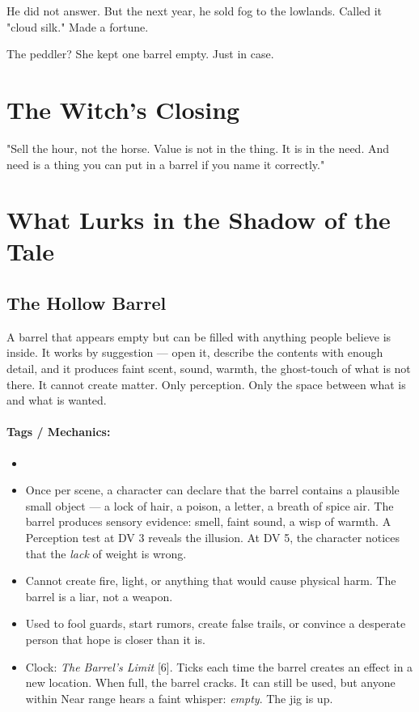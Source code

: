 He did not answer. But the next year, he sold fog to the lowlands. Called it "cloud silk." Made a fortune.

The peddler? She kept one barrel empty. Just in case.

\section*{The Witch's Closing}
"Sell the hour, not the horse. Value is not in the thing. It is in the need. And need is a thing you can put in a barrel if you name it correctly."

\section*{What Lurks in the Shadow of the Tale}

\subsection*{The Hollow Barrel}

A barrel that appears empty but can be filled with anything people believe is inside. It works by suggestion — open it, describe the contents with enough detail, and it produces faint scent, sound, warmth, the ghost-touch of what is not there. It cannot create matter. Only perception. Only the space between what is and what is wanted.

\paragraph{Tags / Mechanics:}
\begin{itemize}
\item [ILLUSION] [TRICK] [VEIL]
\item Once per scene, a character can declare that the barrel contains a plausible small object — a lock of hair, a poison, a letter, a breath of spice air. The barrel produces sensory evidence: smell, faint sound, a wisp of warmth. A Perception test at DV 3 reveals the illusion. At DV 5, the character notices that the \textit{lack} of weight is wrong.
\item Cannot create fire, light, or anything that would cause physical harm. The barrel is a liar, not a weapon.
\item Used to fool guards, start rumors, create false trails, or convince a desperate person that hope is closer than it is.
\item Clock: \textit{The Barrel's Limit} [6]. Ticks each time the barrel creates an effect in a new location. When full, the barrel cracks. It can still be used, but anyone within Near range hears a faint whisper: \textit{empty}. The jig is up.
\end{itemize}

